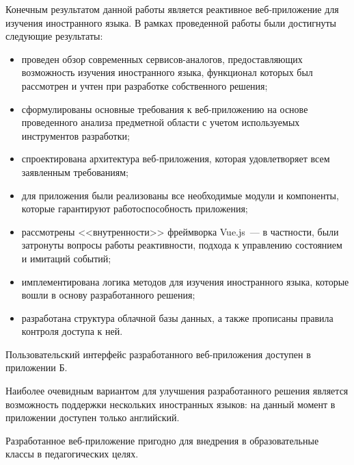 \Conclusion %

Конечным результатом данной работы является реактивное веб-приложение для изучения иностранного языка. В рамках проведенной работы были достигнуты следующие результаты:

\begin{itemize}
	\item проведен обзор современных сервисов-аналогов, предоставляющих возможность изучения иностранного языка, функционал которых был рассмотрен и учтен при разработке собственного решения;
	\item сформулированы основные требования к веб-приложению на основе проведенного анализа предметной области с учетом используемых инструментов разработки;
	\item спроектирована архитектура веб-приложения, которая удовлетворяет всем заявленным требованиям;
	\item для приложения были реализованы все необходимые модули и компоненты, которые гарантируют работоспособность приложения;
	\item рассмотрены <<внутренности>> фреймворка Vue.js~--- в частности, были затронуты вопросы работы реактивности, подхода к управлению состоянием и имитаций событий;
	\item имплементирована логика методов для изучения иностранного языка, которые вошли в основу разработанного решения;
	\item разработана структура облачной базы данных, а также прописаны правила контроля доступа к ней.
\end{itemize}

Пользовательский интерфейс разработанного веб-приложения доступен в приложении Б.

Наиболее очевидным вариантом для улучшения разработанного решения является возможность поддержки нескольких иностранных языков: на данный момент в приложении доступен только английский.

Разработанное веб-приложение пригодно для внедрения в образовательные классы в педагогических целях.

